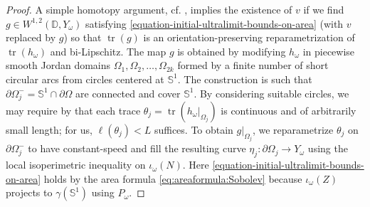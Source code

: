 \documentclass[a4paper,leqno]{amsart}
\numberwithin{equation}{section}
\theoremstyle{remark}
\theoremstyle{remark}
\DeclareMathOperator{\trace}{tr}
\begin{document}
\begin{proof}
A simple homotopy argument, cf. \cite[Lemma 2.6]{Lyt:Wen:16}, implies the existence of $v$ if we find $g \in W^{1,2}( \mathbb{D}, Y_\omega )$ satisfying \eqref{equation-initial-ultralimit-bounds-on-area} (with $v$ replaced by $g$) so that $\trace(g)$ is an orientation-preserving reparametrization of $\trace(h_\omega)$ and bi-Lipschitz. The map $g$ is obtained by modifying $h_\omega$ in piecewise smooth Jordan domains $\Omega_1, \Omega_2, \dots, \Omega_{2k}$ formed by a finite number of short circular arcs from circles centered at $\mathbb{S}^1$. The construction is such that $\partial \Omega^{-}_j = \mathbb{S}^1 \cap \partial \Omega$ are connected and cover $\mathbb{S}^1$. By considering suitable circles, we may require by \cite[Lemma 6.4]{stadler-wenger-2025-isoperimetric-inequalities-vs-upper-curvature-bounds} that each trace $\theta_j = \trace( h_\omega|_{\Omega_j} )$ is continuous and of arbitrarily small length; for us, $\ell( \theta_j ) < L$ suffices. To obtain $g|_{\Omega_j}$, we reparametrize $\theta_j$ on $\partial\Omega_j^{-}$ to have constant-speed and fill the resulting curve $\eta_j \colon \partial \Omega_j \to Y_\omega$ using the local isoperimetric inequality on $\iota_\omega(N)$. Here \eqref{equation-initial-ultralimit-bounds-on-area} holds by the area formula \eqref{eq:areaformula:Sobolev} because $\iota_\omega(Z)$ projects to $\gamma( \mathbb{S}^1 )$ using $P_\omega$.
\end{proof}
\end{document}
